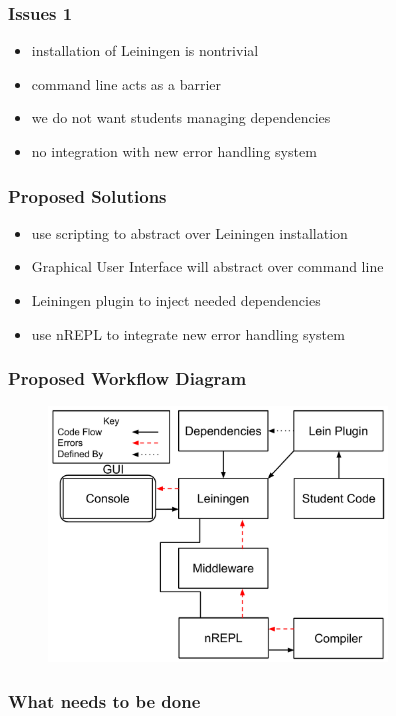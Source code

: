 \documentclass{beamer}
\begin{document}
\begin{frame}
\frametitle{Issues 1}
	\begin{itemize}
		\item installation of Leiningen is nontrivial
		\item command line acts as a barrier
		\item we do not want students managing dependencies
		\item no integration with new error handling system
	\end{itemize} 
\end{frame}

\begin{frame}
\frametitle{Proposed Solutions}
	\begin{itemize}
		\item use scripting to abstract over Leiningen installation
		\item Graphical User Interface will abstract over command line
		\item Leiningen plugin to inject needed dependencies
		\item use nREPL to integrate new error handling system
	\end{itemize}
\end{frame}

\begin{frame}[fragile]
\frametitle{Proposed Workflow Diagram}
\begin{figure}[h]
 \includegraphics[width=9cm]{../OurErrorHandlingSystem.pdf}
 \centering
\end{figure}
\end{frame}

\begin{frame}
\frametitle{What needs to be done}
\end{frame}
\end{document}
